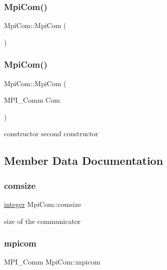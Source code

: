 \subsubsection{\texorpdfstring{Mpi\+Com()}{MpiCom()}\hspace{0.1cm}{\footnotesize\ttfamily [1/2]}}
{\footnotesize\ttfamily Mpi\+Com\+::\+Mpi\+Com (\begin{DoxyParamCaption}{ }\end{DoxyParamCaption})\hspace{0.3cm}{\ttfamily [inline]}}

\mbox{\label{structMpiCom_a5099477d534468bdaffed3bb75e31152}} 
\subsubsection{\texorpdfstring{Mpi\+Com()}{MpiCom()}\hspace{0.1cm}{\footnotesize\ttfamily [2/2]}}
{\footnotesize\ttfamily Mpi\+Com\+::\+Mpi\+Com (\begin{DoxyParamCaption}\item[{M\+P\+I\+\_\+\+Comm}]{Com }\end{DoxyParamCaption})}

constructor second constructor 

\subsection{Member Data Documentation}
\mbox{\label{structMpiCom_a45b9f4f480725b1e51fad5c76273b7d2}} 
\subsubsection{\texorpdfstring{comsize}{comsize}}
{\footnotesize\ttfamily \mbox{\hyperlink{definitions_8h_adbd822dbdb8152553a0f77b84915bd8d}{integer}} Mpi\+Com\+::comsize}

size of the communicator \mbox{\label{structMpiCom_aa7f455e509e222dc08a2dc22ef922b98}} 
\subsubsection{\texorpdfstring{mpicom}{mpicom}}
{\footnotesize\ttfamily M\+P\+I\+\_\+\+Comm Mpi\+Com\+::mpicom}

